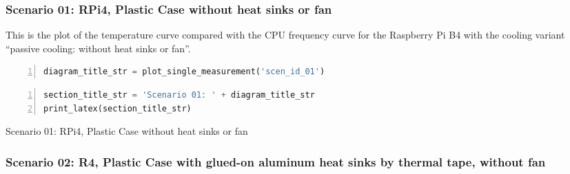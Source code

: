\documentclass[10pt,parskip=half,
toc=sectionentrywithdots,
bibliography=totocnumbered,
captions=tableheading,numbers=noendperiod]{scrartcl}
\begin{document}
\begin{figure}[H]\begin{center}\end{center}\end{figure}

\hypertarget{scenario-01-rpi4-plastic-case-without-heat-sinks-or-fan}{%
\subsubsection{Scenario 01: RPi4, Plastic Case without heat sinks or
fan}\label{scenario-01-rpi4-plastic-case-without-heat-sinks-or-fan}}

This is the plot of the temperature curve compared with the CPU
frequency curve for the Raspberry Pi B4 with the cooling variant
``passive cooling: without heat sinks or fan''.

\begin{lstlisting}[language=Python,numbers=left,xleftmargin=20pt,xrightmargin=5pt,belowskip=5pt,aboveskip=5pt]
diagram_title_str = plot_single_measurement('scen_id_01')
\end{lstlisting}

\begin{figure}[H]\begin{center}\end{center}\end{figure}

\begin{lstlisting}[language=Python,numbers=left,xleftmargin=20pt,xrightmargin=5pt,belowskip=5pt,aboveskip=5pt]
section_title_str = 'Scenario 01: ' + diagram_title_str
print_latex(section_title_str)
\end{lstlisting}

\begin{table}[H]
\centering
\begin{adjustbox}{max width=\textwidth}
Scenario 01: RPi4, Plastic Case without heat sinks or fan
\end{adjustbox}
\end{table}

\hypertarget{scenario-02-r4-plastic-case-with-glued-on-aluminum-heat-sinks-by-thermal-tape-without-fan}{%
\subsubsection{Scenario 02: R4, Plastic Case with glued-on aluminum heat
sinks by thermal tape, without
fan}\label{scenario-02-r4-plastic-case-with-glued-on-aluminum-heat-sinks-by-thermal-tape-without-fan}}
\end{document}
